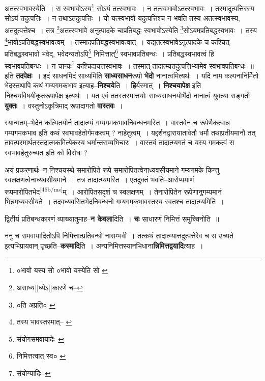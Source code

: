 \documentclass[article,12pt,a4paper]{memoir}
\begin{document}
	अतत्स्वभावस्येति । स स्वभावोऽस्य\footnote{०भावो यस्य सो \cite{dp-msD} ०भावो यस्येति सो \cite{dp-msC}} सोऽयं तत्स्वभावः । न तत्स्वभावोऽतत्स्वभावः । तस्मादुत्पत्तिरस्य सोऽयं तदुत्पत्तिः । न तथाऽतदुत्पत्तिः । यो यत्स्वभावो यदुत्पत्तिश्च न भवति तस्य अतत्स्वभावस्य, अतदुत्पत्तेश्च । तत्र \footnote{असाध्य[[ध्येऽ]]कारणे च--\cite{dp-msD-n}}अतत्स्वभावे अनुत्पादके चाप्रतिबद्धः स्वभावोऽस्येति \footnote{०ति अप्रति० \cite{dp-msD}}सोऽयमप्रतिबद्धस्वभावः । तस्य \footnote{तस्य भावस्तस्मात्--\cite{dp-msD} \cite{dp-msC}}भावोऽप्रतिबद्धस्वभावत्वम् । तस्मादप्रतिबद्धस्वभावत्वात् । यद्यतत्स्वभावेऽनुत्पादके च कश्चित् प्रतिबद्धस्वभावो भवेद्, भवेदन्यतोऽपि\footnote{संयोगसमवायादेः--\cite{dp-msD-n}} निमित्तात्\footnote{निमित्तत्वात् स्व० \cite{dp-msC}} स्वभावप्रतिबन्धः । प्रतिबद्धस्वभावत्वं हि स्वभावप्रतिबन्धः । न चान्यः\footnote{संयोग्यादिः--\cite{dp-msD-n}} कश्चिदायत्तस्वभावः । तस्मात् तादात्म्यतदुत्पत्तिभ्यामेव स्वभावप्रतिबन्धः ॥ इति \textbf{तदपेक्षः} । इदं साधनमिदं साध्यमिति \textbf{साध्यसाधन}रूपो \textbf{भेदो} नानात्वमित्यर्थः । यदि नाम कल्पनानिर्मितो भेदस्तथापि कथं गम्यगमकभाव इत्याह--\textbf{निश्चये}ति । \textbf{हि}र्यस्मात् । \textbf{निश्चयापेक्ष} इति निश्चयविषयीकृतरूपापेक्ष इत्यर्थः । यत एवं ततस्तस्मात्तयोः साध्यसाधनयोर्भेदो नानात्वं युक्त्या सङ्गतो \textbf{युक्तः} । वस्तुनोऽकृत्रिमाद् रूपादागतो \textbf{वास्तवः} ।
	\pend
      

	  \pstart स्यान्मतम्--भेदेन कल्पितयोर्न तादात्म्यं गम्यगमकभावनिबन्धनमस्ति । वास्तवेन च रूपेणैकत्वान्न गम्यगमकभाव इति कथं स्वभावहेतोर्गमकत्वम् ? नाहेतुत्वम् । यद्दर्शनद्वारायातावेतौ धर्मौ तथाप्रतीयमानौ तत् तावत्परमार्थतस्तदात्मकमित्येकस्य धर्मान्तराव्यभिचारः । वास्तवं तादात्म्यगतं च यस्य गमकत्वं स स्वभावहेतुरुच्यत इति को विरोधः ?
	\pend
      

	  \pstart अयं प्रकरणार्थः--न निश्चयस्थे समारोपिते रूपे समारोपितत्वेनाध्यवसीयमाने गम्यगमके किन्तु स्वलक्षणत्वेनाध्यवसीयमाने । तत्र तादात्म्यमस्ति । एतदुक्तं भवति--आरोप्यमाणं रूपमारोपितभेद\leavevmode\textsuperscript{\rmlatinfont\tiny [46b/ms]}म् । आरोपितसदृशं च स्वलक्षणम् । तेनारोपितेन रूपेणानुगम्यमानं भिन्नमघ्यवसीयते । तदवध्यवसितभेदनिबन्धनो गम्यगमकभावस्तस्य स्वतश्च तादात्म्यमिति ।
	\pend
      

	  \pstart द्वितीयं प्रतिबन्धकारणं व्याख्यातुमाह--\textbf{न केवला}दिति । \textbf{चः} साधारणं निमित्तं समुच्चिनोति ॥
	\pend
      

	  \pstart ननु च समवायादितोऽपि निमित्तात्प्रतिबन्धो नासम्भवी । तत्कथं तादात्म्यात्तदुत्पत्तेरेव च स उच्यते इत्यभिप्रायवान् पृच्छति--\textbf{कस्मादि}ति । अन्यनिमित्तस्यानभिधाना\textbf{न्निमित्तद्वयादि}त्याह ।
	\pend
      
\end{document}
